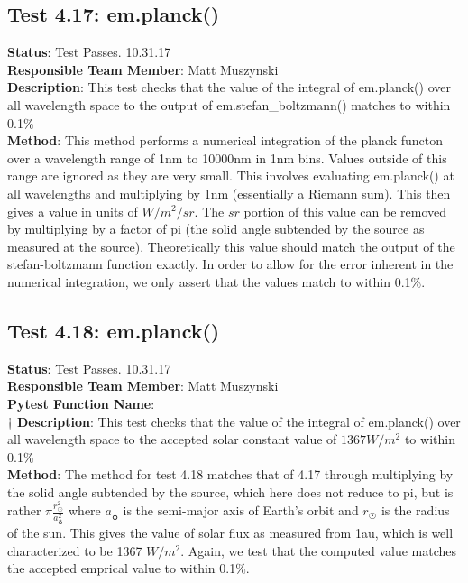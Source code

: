 \documentclass[]{DINOReportMemo}
\begin{document}
\subsection{Test 4.17: em.planck()}
\textbf{Status}: Test Passes. 10.31.17\\
\textbf{Responsible Team Member}: Matt Muszynski \\
\textbf{Description}: This test checks that the value of the integral of em.planck() over all wavelength space to the output of em.stefan\_boltzmann() matches to within 0.1\% \\
\textbf{Method}: This method performs a numerical integration of the planck functon over a wavelength range of 1nm to 10000nm in 1nm bins. Values outside of this range are ignored as they are very small. This involves evaluating em.planck() at all wavelengths and multiplying by 1nm (essentially a Riemann sum). This then gives a value in units of $W/m^2/sr$. The $sr$ portion of this value can be removed by multiplying by a factor of pi (the solid angle subtended by the source as measured at the source). Theoretically this value should match the output of the stefan-boltzmann function exactly. In order to allow for the error inherent in the numerical integration, we only assert that the values match to within 0.1\%.\\

\subsection{Test 4.18: em.planck()}
\textbf{Status}: Test Passes. 10.31.17\\
\textbf{Responsible Team Member}: Matt Muszynski \\
\textbf{Pytest Function Name}: \\†
\textbf{Description}: This test checks that the value of the integral of em.planck() over all wavelength space to the accepted solar constant value of $1367 W/m^2$ to within 0.1\% \\
\textbf{Method}: The method for test 4.18 matches that of 4.17 through multiplying by the solid angle subtended by the source, which here does not reduce to pi, but is rather $\pi\frac{r^2_\astrosun}{a^2_\earth}$ where $a_\earth$ is the semi-major axis of Earth's orbit and $r_\astrosun$ is the radius of the sun. This gives the value of solar flux as measured from 1au, which is well characterized to be 1367 $W/m^2$. Again, we test that the computed value matches the accepted emprical value to within 0.1\%. \\
\end{document}
